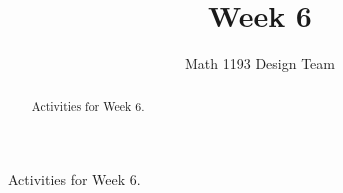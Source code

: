 \documentclass[noauthor]{ximera}
\title{Week 6}
\author{Math 1193 Design Team}
\begin{document}
\begin{abstract}
    Activities for Week 6.
\end{abstract}
\maketitle

Activities for Week 6.
\end{document}
